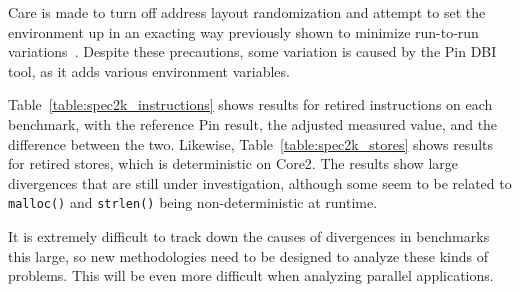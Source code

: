 Care is made to turn off address layout randomization and attempt to 
set the environment up in an exacting way previously shown to 
minimize run-to-run variations~\cite{weaver+:iiswc08}.
Despite these precautions, some variation is caused by the Pin DBI tool, 
as it adds various environment variables.

Table~\ref{table:spec2k_instructions} shows results for retired 
instructions on 
each benchmark, with the reference Pin result, the adjusted measured
value, and the difference between the two.  Likewise,
Table~\ref{table:spec2k_stores} shows results for retired stores, which
is deterministic on Core2.
The results show large divergences that are still under investigation,
although some seem to be related to {\tt malloc()} and
{\tt strlen()} being non-deterministic at runtime.

It is extremely difficult to track down the causes of divergences in 
benchmarks this large, so new methodologies need to be designed
to analyze these kinds of problems.  This will be even more
difficult when analyzing parallel applications.
